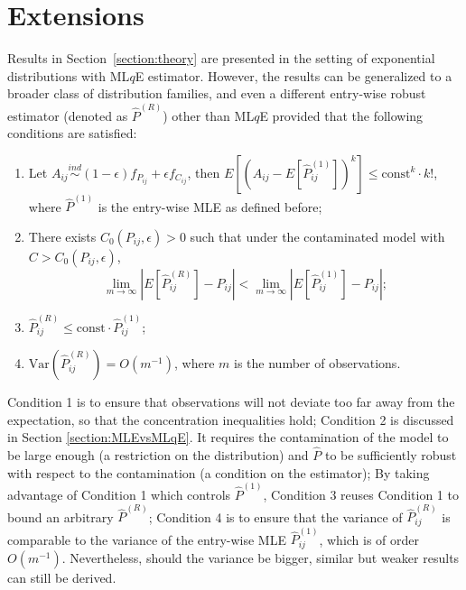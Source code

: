 \documentclass[a4paper]{article}
\renewcommand{\hat}{\widehat}
\begin{document}
\section{Extensions}
\label{section:extension}

Results in Section~\ref{section:theory} are presented in the setting of exponential distributions with ML$q$E estimator. However, the results can be generalized to a broader class of distribution families, and even a different entry-wise robust estimator (denoted as $\hat{P}^{(R)}$) other than ML$q$E provided that the following conditions are satisfied:
\begin{enumerate}
\item Let $A_{ij} \stackrel{ind}{\sim} (1-\epsilon) f_{P_{ij}} + \epsilon f_{C_{ij}}$, then $E[(A_{ij} - E[\hat{P}_{ij}^{(1)}])^k] \le \mathrm{const}^k \cdot k!$, where $\hat{P}^{(1)}$ is the entry-wise MLE as defined before;
\item There exists $C_0(P_{ij}, \epsilon) > 0$ such that under the contaminated model with $C > C_0(P_{ij}, \epsilon)$,
\[
	\lim_{m \to \infty} \left| E[\hat{P}^{(R)}_{ij}] - P_{ij} \right| < 
    \lim_{m \to \infty} \left| E[\hat{P}^{(1)}_{ij}] - P_{ij} \right|;
\]
\item $\hat{P}^{(R)}_{ij} \le \mathrm{const} \cdot \hat{P}_{ij}^{(1)}$;
\item $\mathrm{Var}(\hat{P}^{(R)}_{ij}) = O(m^{-1})$, where $m$ is the number of observations.
\end{enumerate}


Condition 1 is to ensure that observations will not deviate too far away from the expectation, so that the concentration inequalities hold;
Condition 2 is discussed in Section \ref{section:MLEvsMLqE}. It requires the contamination of the model to be large enough (a restriction on the distribution) and $\hat{P}$ to be sufficiently robust with respect to the contamination (a condition on the estimator);
By taking advantage of Condition 1 which controls $\hat{P}^{(1)}$, Condition 3 reuses Condition 1 to bound an arbitrary $\hat{P}^{(R)}$;
Condition 4 is to ensure that the variance of $\hat{P}^{(R)}_{ij}$ is comparable to the variance of the entry-wise MLE $\hat{P}^{(1)}_{ij}$, which is of order $O(m^{-1})$. Nevertheless, should the variance be bigger, similar but weaker results can still be derived.
\end{document}

